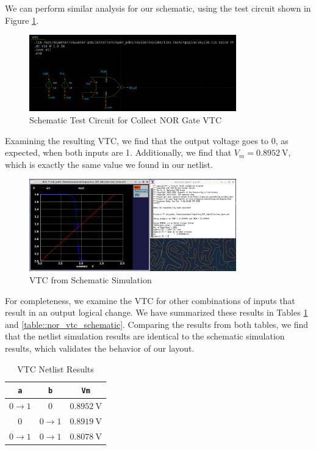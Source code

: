 \documentclass{article}
\begin{document}
	\noindent We can perform similar analysis for our schematic, using the test circuit shown in Figure \ref{fig::nor_vtc_schem_test_circuit}.
	
	\begin{figure}[H]
		\centerline{\includegraphics[width=0.8\textwidth]{nor_vtc_test_circuit.png}}
		\caption{Schematic Test Circuit for Collect NOR Gate VTC}
		\label{fig::nor_vtc_schem_test_circuit}
	\end{figure}
	
	\noindent Examining the resulting VTC, we find that the output voltage goes to 0, as expected, when both inputs are 1. Additionally, we find that $V_m = 0.8952\ \text{V}$, which is exactly the same value we found in our netlist.
	
	\begin{figure}[H]
		\centerline{\includegraphics[width=0.8\textwidth]{nor_vtc_schem.png}}
		\caption{VTC from Schematic Simulation}
		\label{fig::nor_vtc_schem}
	\end{figure}
	
	For completeness, we examine the VTC for other combinations of inputs that result in an output logical change. We have summarized these results in Tables \ref{table::nor_vtc_netlist} and \ref{table::nor_vtc_schematic}. Comparing the results from both tables, we find that the netlist simulation results are identical to the schematic simulation results, which validates the behavior of our layout. 
	
	\begin{table}[H]
	\begin{center}
	\caption{VTC Netlist Results}
	\label{table::nor_vtc_netlist}
	\begin{tabular}{| c | c | c |}
		\hline
		\texttt{a} & \texttt{b} & \texttt{Vm}\\
		\hline	
		$0 \rightarrow 1$ & $0$ & $0.8952\ \text{V}$\\
		\hline	
		$0$ & $0 \rightarrow 1$ & $0.8919\ \text{V}$\\
		\hline	
		$0 \rightarrow 1$ & $0 \rightarrow 1$ & $0.8078\ \text{V}$\\
		\hline
	\end{tabular}
	\end{center}
	\end{table}
	
\end{document}
